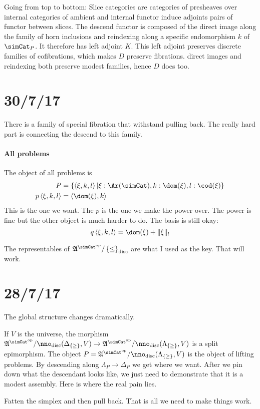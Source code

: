 \documentclass{tac}
\newcommand\set[1]{\left\{#1\right\}}
\newcommand\dual{^{\mathrm{op}}}
\newcommand\s{^{\simCat\dual}}
\newcommand\of{:}
\newcommand\simplex\Delta
\newcommand\horn\Lambda
\newcommand\tuplet[1]{\left\langle #1 \right\rangle}
\newcommand\norm[1]{\Vert #1 \Vert}
\newcommand\ambient{\mathfrak A}
\newcommand\disc{_{\rm disc}}
\begin{document}
Going from top to bottom:
Slice categories are categories of presheaves over internal categories of ambient and internal functor induce adjoints pairs of functor between slices.
The descend functor is composed of the direct image along the family of horn inclusions and reindexing along a specific endomorphism $k$ of $\simCat_P$. 
It therefore has left adjoint $K$. This left adjoint preserves discrete families of cofibrations, which makes $D$ preserve fibrations. direct images and reindexing both preserve modest families, hence $D$ does too.
\section{30/7/17}

There is a family of special fibration that withstand pulling back. The really hard part is connecting the descend to this family.

\paragraph{All problems}
The object of all problems is 
\begin{align*} 
P &= \set{\tuplet{\xi,k,l}|\xi\of\Ar(\simCat),k\of\dom(\xi),l\of\cod(\xi)}\\
p\tuplet{\xi,k,l} &= \tuplet{\dom(\xi),k}
\end{align*}
This is the one we want. The $p$ is the one we make the power over. The power is fine but the other object is much harder to do. The basis is still okay:
\[ q\tuplet{\xi,k,l} = \dom(\xi)+\norm\xi_l \]

The representables of $\ambient\s/\set\leq\disc$ are what I used as the key. That will work.

\section{28/7/17}
The global structure changes dramatically.

If $V$ is the universe, the morphism $\ambient\s/\nno\disc(\simplex_{\set\geq},V)\to \ambient\s/\nno\disc(\horn_{\set\geq},V)$ is a split epimorphism. 
The object $P=\ambient\s/\nno\disc(\horn_{\set\geq},V)$ is the object of lifting problems. By descending along $\horn_P\to \simplex_P$ we get where we want.
After we pin down what the descendant looks like, we just need to demonstrate that it is a modest assembly.
Here is where the real pain lies.

Fatten the simplex and then pull back. That is all we need to make things work.
\end{document}
